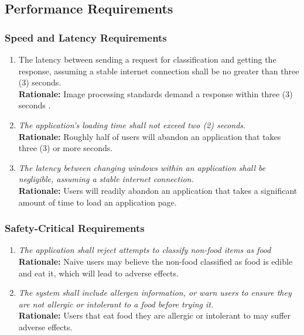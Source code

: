 \documentclass[]{article}
\begin{document}

\subsection{Performance Requirements}
\label{sub:performance_requirements}

\subsubsection{Speed and Latency Requirements}
\label{ssub:speed_and_latency_requirements}
\begin{enumerate}[{PR-SL}1. ]
	\item The latency between sending a request for classification and getting the response, assuming a stable internet connection shall be no greater than three (3) seconds. \\ \textbf{Rationale:} Image processing standards demand a response within three (3) seconds \cite{Umentis}.
    \item \textit{The application's loading time shall not exceed two (2) seconds}. \\ \textbf{Rationale:} Roughly half of users will abandon an application that takes three (3) or more seconds.\cite{StoryLy}
    \item \textit{The latency between changing windows within an application shall be negligible, assuming a stable internet connection.} \\ \textbf{Rationale:} Users will readily abandon an application that takes a significant amount of time to load an application page.
\end{enumerate}

\subsubsection{Safety-Critical Requirements}
\label{ssub:safety_critical_requirements}
\begin{enumerate}[{PR-SC}1. ]
	\item \textit{The application shall reject attempts to classify non-food items as food} \\ \textbf{Rationale:} Naive users may believe the non-food classified as food is edible and eat it, which will lead to adverse effects.
    \item \textit{The system shall include allergen information, or warn users to ensure they are not allergic or intolerant to a food before trying it.} \\ \textbf{Rationale:} Users that eat food they are allergic or intolerant to may suffer adverse effects.
\end{enumerate}
\end{document}
